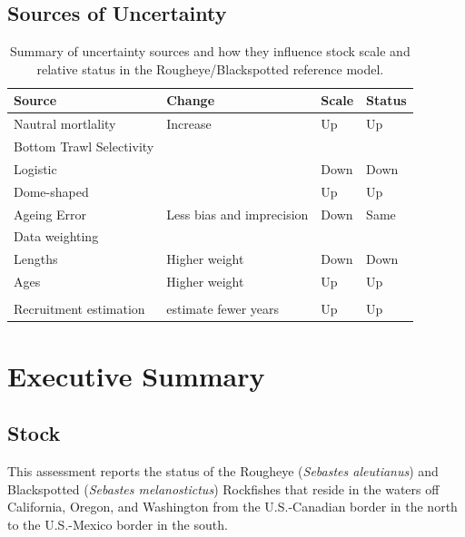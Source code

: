 \documentclass[
]{scrartcl}
\begin{document}
\subsection{Sources of Uncertainty}\label{sources-of-uncertainty}

\begingroup
\fontsize{9.0pt}{10.8pt}\selectfont

\begin{longtable}{llll}

\caption{\label{tbl-uncertainty_summary_viz}Summary of uncertainty
sources and how they influence stock scale and relative status in the
Rougheye/Blackspotted reference model.}

\tabularnewline

\toprule
Source & Change & Scale & Status \\ 
\midrule\addlinespace[2.5pt]
Nautral mortlality & Increase & Up & Up \\ 
Bottom Trawl Selectivity &  &  &  \\ 
Logistic &  & Down & Down \\ 
Dome-shaped &  & Up & Up \\ 
Ageing Error & Less bias and imprecision & Down & Same \\ 
Data weighting &  &  &  \\ 
Lengths & Higher weight & Down & Down \\ 
Ages & Higher weight & Up & Up \\ 
 &  &  &  \\ 
Recruitment estimation & estimate fewer years & Up & Up \\ 
\bottomrule

\end{longtable}

\endgroup

\newpage{}

\section*{Executive Summary}\label{executive-summary}

\subsection*{Stock}\label{stock}

This assessment reports the status of the Rougheye (\emph{Sebastes
aleutianus}) and Blackspotted (\emph{Sebastes melanostictus}) Rockfishes
that reside in the waters off California, Oregon, and Washington from
the U.S.-Canadian border in the north to the U.S.-Mexico border in the
south.
\end{document}
